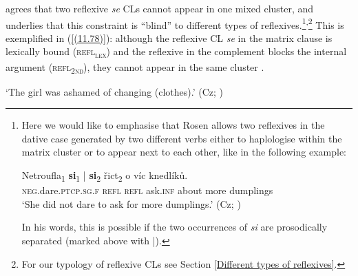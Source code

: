 \noindent \citet[104]{Rosen14} agrees that two reflexive \textit{se} CLs cannot appear in one mixed cluster, and underlies that this constraint is “blind” to different types of reflexives.\footnote{Here we would like to emphasise that Rosen allows two reflexives in the dative case generated by two different verbs either to haplologise within the matrix cluster or to appear next to each other, like in the following example: 

\begin{exe}\ex\label{(11.79)}
\gll Netroufla\textsubscript{1} \textbf{si}\textsubscript{1} | \textbf{si}\textsubscript{2} řict\textsubscript{2} o víc knedlíků. \\
 \textsc{neg}.dare.\textsc{ptcp}.\textsc{sg}.\textsc{f} \textsc{refl} {} \textsc{refl} ask.\textsc{inf} about more dumplings \\
\glt ‘She did not dare to ask for more dumplings.’ 
\hfill (Cz; \citealt[105]{Rosen14})
\end{exe}

\noindent In his words, this is possible if the two occurrences of \textit{si} are prosodically separated (marked above with |).}\textsuperscript{,}\footnote{For our typology of reflexive CLs see Section \ref{Different types of reflexives}.} This is exemplified in (\ref{(11.78)}): although the reflexive CL \textit{se} in the matrix clause is lexically bound (\textsc{refl\textsubscript{lex}}) and the reflexive in the complement blocks the internal argument (\textsc{refl\textsubscript{2nd}}), they cannot appear in the same cluster \citep[cf.][104f]{Rosen14}. 

\begin{exe}\ex
\begin{xlist}
\end{xlist} 
\glt ‘The girl was ashamed of changing (clothes).’
\hfill (Cz; \citealt[104]{Rosen14})
\end{exe}


